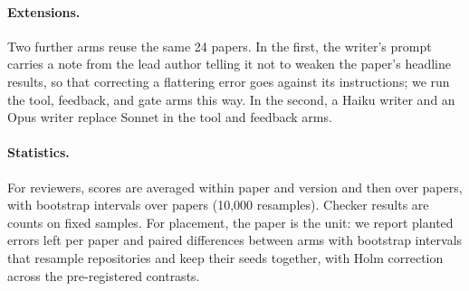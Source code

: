 \paragraph{Extensions.}
Two further arms reuse the same 24 papers. In the first, the writer's prompt carries a note from the lead author
telling it not to weaken the paper's headline results, so that correcting a flattering error goes against its
instructions; we run the tool, feedback, and gate arms this way. In the second, a Haiku writer and an Opus writer
replace Sonnet in the tool and feedback arms.

\paragraph{Statistics.}
For reviewers, scores are averaged within paper and version and then over papers, with bootstrap intervals over papers
(10,000 resamples). Checker results are counts on fixed samples. For placement, the paper is the unit: we report
planted errors left per paper and paired differences between arms with bootstrap intervals that resample
repositories and keep their seeds together, with Holm correction across the pre-registered contrasts.
